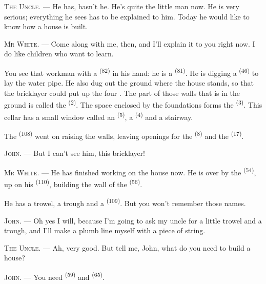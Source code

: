 \textsc{The Uncle}. --- He has, hasn't he. He's quite the little man now. He is very serious;
everything he sees has to be explained to him. Today he would like to know how a house is
built.

\VUsaut{3.0mm}

\textsc{Mr White}. --- Come along with me, then, and I'll explain it to you right now. I do
like children who want to learn.

You see that workman with a  \textsuperscript{(82)} in his hand: he is a
 \textsuperscript{(81)}. He is digging a  \textsuperscript{(46)}
to lay the water pipe. He also dug out the ground where the house stands, so that the
bricklayer could put up the four
. The part of those walls that is in the ground is called
the  \textsuperscript{(2)}. The space enclosed by the foundations forms
the  \textsuperscript{(3)}. This cellar has a small window called an
 \textsuperscript{(5)}, a  \textsuperscript{(4)} and a stairway.

The  \textsuperscript{(108)} went on raising the walls, leaving openings
for the  \textsuperscript{(8)} and the  \textsuperscript{(17)}.

\textsc{John}. --- But I can't see him, this bricklayer!

\textsc{Mr White}. --- He has finished working on the house now. He is over by the
 \textsuperscript{(54)}, up on his 
\textsuperscript{(110)}, building the wall of the  \textsuperscript{(56)}.

He has a trowel, a trough and a  \textsuperscript{(109)}. But you won't
remember those names.

\textsc{John}. --- Oh yes I will, because I'm going to ask my uncle for a little trowel and a
trough, and I'll make a plumb line myself with a piece of string.

\VUsaut{3.0mm}
\VUsaut{3.0mm}

\textsc{The Uncle}. --- Ah, very good. But tell me, John, what do you need to build a house?

\textsc{John}. --- You need  \textsuperscript{(59)} and
 \textsuperscript{(65)}.

